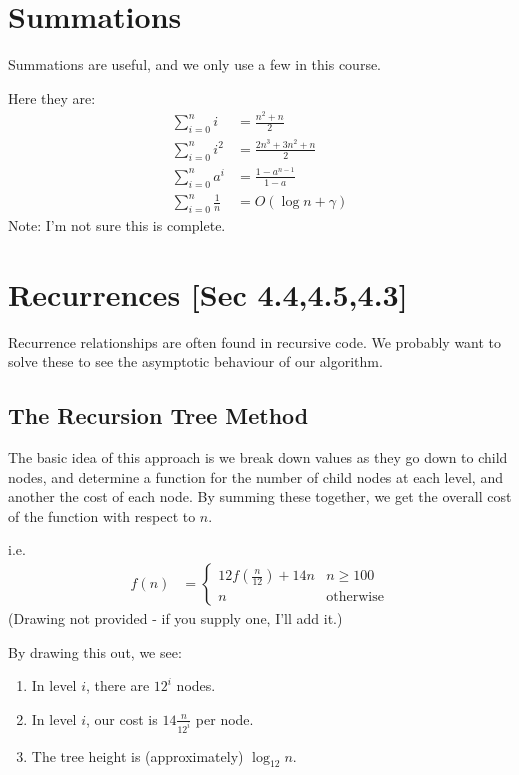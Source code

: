    \section{Summations}
        Summations are useful, and we only use a few in this course.

        Here they are:
        \begin{align*}
            \sum_{i=0}^n i &= \frac{n^2 + n}{2} \\
            \sum_{i=0}^n i^2 &= \frac{2n^3 + 3n^2 + n}{2} \\
            \sum_{i=0}^n a^i &= \frac{1 - a^{n-1}}{1-a} \\
            \sum_{i=0}^n \frac{1}{n} &= O(\log n + \gamma)
        \end{align*}
        Note: I'm not sure this is complete.

    \section{Recurrences [Sec 4.4,4.5,4.3]}
        Recurrence relationships are often found in recursive code. We probably
        want to solve these to see the asymptotic behaviour of our algorithm.

        \subsection{The Recursion Tree Method}
            The basic idea of this approach is we break down values as they go
            down to child nodes, and determine a function for the number of
            child nodes at each level, and another the cost of each node. By
            summing these together, we get the overall cost of the function with
            respect to $n$.

            i.e.
            \begin{align*}
                f(n) &= \left\{
                    \begin{array}{lr}
                        12 f\left(\frac{n}{12}\right) + 14n & n \ge 100 \\
                        n & \text{otherwise}
                    \end{array}
                \right.
            \end{align*}
            (Drawing not provided - if you supply one, I'll add it.)

            By drawing this out, we see:
            \begin{enumerate}
                \item In level $i$, there are $12^i$ nodes.
                \item In level $i$, our cost is $14 \frac{n}{12^i}$ per node.
                \item The tree height is (approximately) $\log_{12}n$.
            \end{enumerate}

